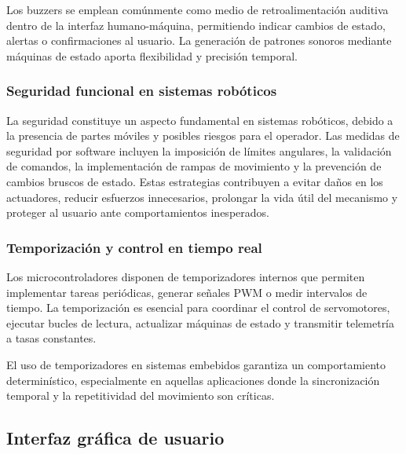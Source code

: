 \vspace{1em}

Los buzzers se emplean comúnmente como medio de retroalimentación auditiva dentro de la interfaz humano-máquina, permitiendo indicar cambios de estado, alertas o confirmaciones al usuario. La generación de patrones sonoros mediante máquinas de estado aporta flexibilidad y precisión temporal.

\subsubsection{Seguridad funcional en sistemas robóticos}

La seguridad constituye un aspecto fundamental en sistemas robóticos, debido a la presencia de partes móviles y posibles riesgos para el operador. Las medidas de seguridad por software incluyen la imposición de límites angulares, la validación de comandos, la implementación de rampas de movimiento y la prevención de cambios bruscos de estado. Estas estrategias contribuyen a evitar daños en los actuadores, reducir esfuerzos innecesarios, prolongar la vida útil del mecanismo y proteger al usuario ante comportamientos inesperados.

\subsubsection{Temporización y control en tiempo real}

Los microcontroladores disponen de temporizadores internos que permiten implementar tareas periódicas, generar señales PWM o medir intervalos de tiempo. La temporización es esencial para coordinar el control de servomotores, ejecutar bucles de lectura, actualizar máquinas de estado y transmitir telemetría a tasas constantes.

\vspace{1em}

El uso de temporizadores en sistemas embebidos garantiza un comportamiento determinístico, especialmente en aquellas aplicaciones donde la sincronización temporal y la repetitividad del movimiento son críticas.






\subsection{Interfaz gráfica de usuario}

